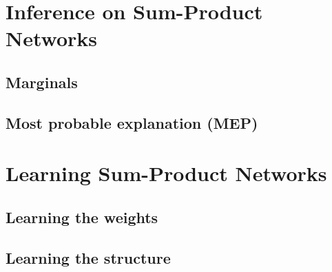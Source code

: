 \documentclass[a4paper,10pt]{article}
\theoremstyle{plain}
\begin{document}
\section{Inference on Sum-Product Networks}

\subsection{Marginals}

\subsection{Most probable explanation (MEP)}

\section{Learning Sum-Product Networks}

\subsection{Learning the weights}

\subsection{Learning the structure}
\end{document}
